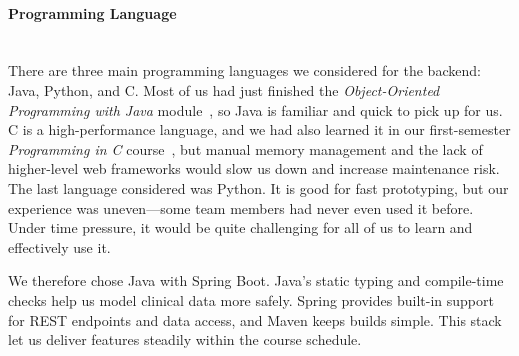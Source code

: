 \paragraph{Programming Language}\mbox{}\\
There are three main programming languages we considered for the backend: Java, Python, and C. Most of us had just finished the \textit{Object-Oriented Programming with Java} module~\cite{uob-oop-java-2024}, so Java is familiar and quick to pick up for us. C is a high-performance language, and we had also learned it in our first-semester \textit{Programming in C} course~\cite{uob-prog-in-c-2024}, but manual memory management and the lack of higher-level web frameworks would slow us down and increase maintenance risk. The last language considered was Python. It is good for fast prototyping, but our experience was uneven—some team members had never even used it before. Under time pressure, it would be quite challenging for all of us to learn and effectively use it.

We therefore chose Java with Spring Boot. Java's static typing and compile-time checks help us model clinical data more safely. Spring provides built-in support for REST endpoints and data access, and Maven keeps builds simple. This stack let us deliver features steadily within the course schedule.
